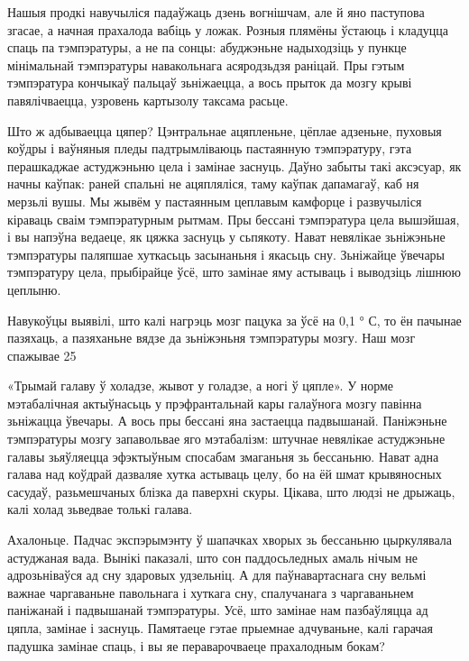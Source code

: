 Нашыя продкі навучыліся падаўжаць дзень вогнішчам, але й яно паступова згасае, а начная прахалода вабіць у ложак. Розныя плямёны ўстаюць і кладуцца спаць па тэмпэратуры, а не па сонцы: абуджэньне надыходзіць у пункце мінімальнай тэмпэратуры навакольнага асяродзьдзя раніцай. Пры гэтым тэмпэратура кончыкаў пальцаў зьніжаецца, а вось прыток да мозгу крыві павялічваецца, узровень картызолу таксама расьце.

Што ж адбываецца цяпер? Цэнтральнае ацяпленьне, цёплае адзеньне, пуховыя коўдры і ваўняныя пледы падтрымліваюць пастаянную тэмпэратуру, гэта перашкаджае астуджэньню цела і замінае заснуць. Даўно забыты такі аксэсуар, як начны каўпак: раней спальні не ацяпляліся, таму каўпак дапамагаў, каб ня мерзьлі вушы. Мы жывём у пастаянным цеплавым камфорце і развучыліся кіраваць сваім тэмпэратурным рытмам. Пры бессані тэмпэратура цела вышэйшая, і вы напэўна ведаеце, як цяжка заснуць у сьпякоту. Нават невялікае зьніжэньне тэмпэратуры паляпшае хуткасьць засынаньня і якасьць сну. Зьніжайце ўвечары тэмпэратуру цела, прыбірайце ўсё, што замінае яму астываць і выводзіць лішнюю цеплыню.

Навукоўцы выявілі, што калі нагрэць мозг пацука за ўсё на 0,1 ° С, то ён пачынае пазяхаць, а пазяханьне вядзе да зьніжэньня тэмпэратуры мозгу. Наш мозг спажывае 25%

«Трымай галаву ў холадзе, жывот у голадзе, а ногі ў цяпле». У норме мэтабалічная актыўнасьць у прэфрантальнай кары галаўнога мозгу павінна зьніжацца ўвечары. А вось пры бессані яна застаецца падвышанай. Паніжэньне тэмпэратуры мозгу запавольвае яго мэтабалізм: штучнае невялікае астуджэньне галавы зьяўляецца эфэктыўным спосабам змаганьня зь бессаньню. Нават адна галава над коўдрай дазваляе хутка астываць целу, бо на ёй шмат крывяносных сасудаў, разьмешчаных блізка да паверхні скуры. Цікава, што людзі не дрыжаць, калі холад зьведвае толькі галава.

Ахалоньце. Падчас экспэрымэнту ў шапачках хворых зь бессаньню цыркулявала астуджаная вада. Вынікі паказалі, што сон паддосьледных амаль нічым не адрозьніваўся ад сну здаровых удзельніц. А для паўнавартаснага сну вельмі важнае чаргаваньне павольнага і хуткага сну, спалучанага з чаргаваньнем паніжанай і падвышанай тэмпэратуры. Усё, што замінае нам пазбаўляцца ад цяпла, замінае і заснуць. Памятаеце гэтае прыемнае адчуваньне, калі гарачая падушка замінае спаць, і вы яе пераварочваеце прахалодным бокам?

